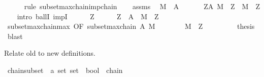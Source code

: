 \begin{isabellebody}
\ \ \ \ \isamarkupfalse%
\ {\isacharparenleft}{\kern0pt}rule\ subset{\isachardot}{\kern0pt}maxchain{\isacharunderscore}{\kern0pt}imp{\isacharunderscore}{\kern0pt}chain{\isacharparenright}{\kern0pt}\isanewline
\ \ \isamarkupfalse%
\ assms\ \isamarkupfalse%
\ {\isachardoublequoteopen}{\isasymUnion}M\ {\isasymin}\ A{\isachardoublequoteclose}\ \isacommand{{\isachardot}{\kern0pt}}\isamarkupfalse%
\isanewline
\ \ \isamarkupfalse%
\ \isamarkupfalse%
\ {\isachardoublequoteopen}{\isasymforall}Z{\isasymin}A{\isachardot}{\kern0pt}\ {\isasymUnion}M\ {\isasymsubseteq}\ Z\ {\isasymlongrightarrow}\ {\isasymUnion}M\ {\isacharequal}{\kern0pt}\ Z{\isachardoublequoteclose}\isanewline
\ \ \isamarkupfalse%
\ {\isacharparenleft}{\kern0pt}intro\ ballI\ impI{\isacharparenright}{\kern0pt}\isanewline
\ \ \ \ \isamarkupfalse%
\ Z\isanewline
\ \ \ \ \isamarkupfalse%
\ {\isachardoublequoteopen}Z\ {\isasymin}\ A{\isachardoublequoteclose}\ \ {\isachardoublequoteopen}{\isasymUnion}M\ {\isasymsubseteq}\ Z{\isachardoublequoteclose}\isanewline
\ \ \ \ \isamarkupfalse%
\ subset{\isacharunderscore}{\kern0pt}maxchain{\isacharunderscore}{\kern0pt}max\ {\isacharbrackleft}{\kern0pt}OF\ {\isacartoucheopen}subset{\isachardot}{\kern0pt}maxchain\ A\ M{\isacartoucheclose}{\isacharbrackright}{\kern0pt}\isanewline
\ \ \ \ \ \ \isamarkupfalse%
\ {\isachardoublequoteopen}{\isasymUnion}M\ {\isacharequal}{\kern0pt}\ Z{\isachardoublequoteclose}\ \isacommand{{\isachardot}{\kern0pt}}\isamarkupfalse%
\isanewline
\ \ \isamarkupfalse%
\isanewline
\ \ \isamarkupfalse%
\ \isamarkupfalse%
\ {\isacharquery}{\kern0pt}thesis\ \isamarkupfalse%
\ blast\isanewline
{}\isamarkupfalse%
%
\endisatagproof
{\isafoldproof}%
%
\isadelimproof
%
\endisadelimproof
%
\isadelimdocument
%
\endisadelimdocument
%
\isatagdocument
%
\isamarkuptrue%
%
\endisatagdocument
{\isafolddocument}%
%
\isadelimdocument
%
\endisadelimdocument
%
\begin{isamarkuptext}%
Relate old to new definitions.%
\end{isamarkuptext}\isamarkuptrue%
\isamarkupfalse%
\ chain{\isacharunderscore}{\kern0pt}subset\ {\isacharcolon}{\kern0pt}{\isacharcolon}{\kern0pt}\ {\isachardoublequoteopen}{\isacharprime}{\kern0pt}a\ set\ set\ {\isasymRightarrow}\ bool{\isachardoublequoteclose}\ \ {\isacharparenleft}{\kern0pt}{\isachardoublequoteopen}chain\isactrlsub {\isasymsubseteq}{\isachardoublequoteclose}{\isacharparenright}{\kern0pt}\ \ \isanewline

\end{isabellebody}
